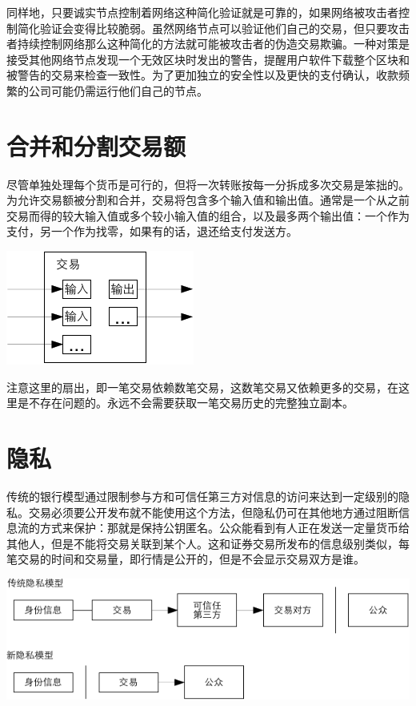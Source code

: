 \documentclass{article}
\begin{document}
同样地，只要诚实节点控制着网络这种简化验证就是可靠的，如果网络被攻击者控制简化验证会变得比较脆弱。虽然网络节点可以验证他们自己的交易，但只要攻击者持续控制网络那么这种简化的方法就可能被攻击者的伪造交易欺骗。一种对策是接受其他网络节点发现一个无效区块时发出的警告，提醒用户软件下载整个区块和被警告的交易来检查一致性。为了更加独立的安全性以及更快的支付确认，收款频繁的公司可能仍需运行他们自己的节点。

\section{合并和分割交易额}
尽管单独处理每个货币是可行的，但将一次转账按每一分拆成多次交易是笨拙的。为允许交易额被分割和合并，交易将包含多个输入值和输出值。通常是一个从之前交易而得的较大输入值或多个较小输入值的组合，以及最多两个输出值：一个作为支付，另一个作为找零，如果有的话，退还给支付发送方。

\begin{center}
 \includegraphics{bitcoin-zh-cn-6}
\end{center}

注意这里的扇出，即一笔交易依赖数笔交易，这数笔交易又依赖更多的交易，在这里是不存在问题的。永远不会需要获取一笔交易历史的完整独立副本。

\section{隐私}
传统的银行模型通过限制参与方和可信任第三方对信息的访问来达到一定级别的隐私。交易必须要公开发布就不能使用这个方法，但隐私仍可在其他地方通过阻断信息流的方式来保护：那就是保持公钥匿名。公众能看到有人正在发送一定量货币给其他人，但是不能将交易关联到某个人。这和证券交易所发布的信息级别类似，每笔交易的时间和交易量，即行情是公开的，但是不会显示交易双方是谁。

\begin{center}
 \includegraphics{bitcoin-zh-cn-7}
\end{center}
\end{document}

